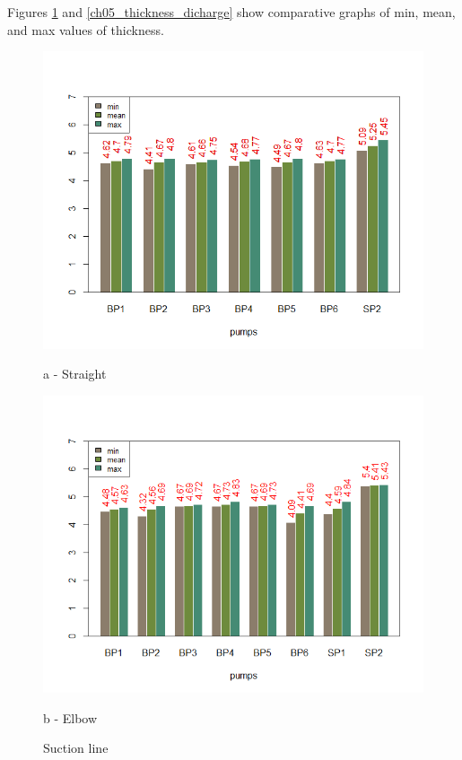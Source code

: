 \begin{table}[h]
{	}
\end{table}

Figures \ref{ch05_thickness_suction} and \ref{ch05_thickness_dicharge} show comparative graphs of min, mean, and max values of thickness.


\begin{figure}[!htb]
	\begin{minipage}[b]{0.5\linewidth}
		\centering
		\includegraphics[width=\textwidth]{figures/ch05_thickness_suction}
		\caption*{a - Straight} 
	\end{minipage}
	\hspace{0.05cm}
	\begin{minipage}[b]{0.5\linewidth}
		\centering
		\includegraphics[width=\textwidth]{figures/ch05_thickness_suctione}
		\caption*{b - Elbow} 
	\end{minipage}
	\caption{Suction line}
	\label{ch05_thickness_suction}
\end{figure}


